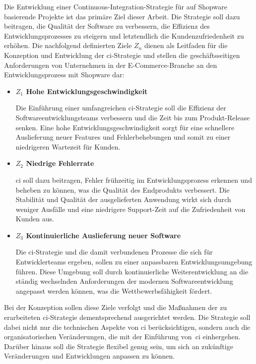 Die Entwicklung einer Continuous-Integration-Strategie für auf Shopware basierende Projekte ist das primäre Ziel
dieser Arbeit.
Die Strategie soll dazu beitragen, die Qualität der Software zu verbessern, die Effizienz des Entwicklungsprozesses zu
steigern und letztendlich die Kundenzufriedenheit zu erhöhen.
Die nachfolgend definierten Ziele $Z_n$ dienen als Leitfaden für die Konzeption und Entwicklung der
\acrshort{ci}-Strategie und stellen die geschäftsseitigen Anforderungen von Unternehmen in der E-Commerce-Branche an den
Entwicklungsprozess mit Shopware dar:

\begin{itemize}
    \item {
        \textbf{$Z_1$ Hohe Entwicklungsgeschwindigkeit}\par
        Die Einführung einer umfangreichen \acrshort{ci}-Strategie soll die Effizienz der Softwareentwicklungsteams
        verbessern und die Zeit bis zum Produkt-Release senken.
        Eine hohe Entwicklungsgeschwindigkeit sorgt für eine schnellere Auslieferung neuer Features und Fehlerbehebungen
        und somit zu einer niedrigeren Wartezeit für Kunden.
    }

    \item {
        \textbf{$Z_2$ Niedrige Fehlerrate}\par
        \acrshort{ci} soll dazu beitragen, Fehler frühzeitig im Entwicklungsprozess erkennen und beheben zu können, was
        die Qualität des Endprodukts verbessert.
        Die Stabilität und Qualität der ausgelieferten Anwendung wirkt sich durch weniger Ausfälle und eine
        niedrigere Support-Zeit auf die Zufriedenheit von Kunden aus.
    }

    \item{
        \textbf{$Z_3$ Kontinuierliche Auslieferung neuer Software}\par
        Die \acrshort{ci}-Strategie und die damit verbundenen Prozesse die sich für Entwicklerteams ergeben, sollen
        zu einer anpassbaren Entwicklungsumgebung führen.
        Diese Umgebung soll durch kontinuierliche Weiterentwicklung an die ständig wechselnden Anforderungen der
        modernen Softwareentwicklung angepasst werden können, was die Wettbewerbsfähigkeit fördert.
    }
\end{itemize}

Bei der Konzeption sollen diese Ziele verfolgt und die Maßnahmen der zu erarbeiteten \acrshort{ci}-Strategie
dementsprechend ausgerichtet werden.
Die Strategie soll dabei nicht nur die technischen Aspekte von \acrlong{ci} berücksichtigen, sondern auch die
organisatorischen Veränderungen, die mit der Einführung von\ \acrshort{ci} einhergehen.
Darüber hinaus soll die Strategie flexibel genug sein, um sich an zukünftige Veränderungen und Entwicklungen anpassen
zu können.


